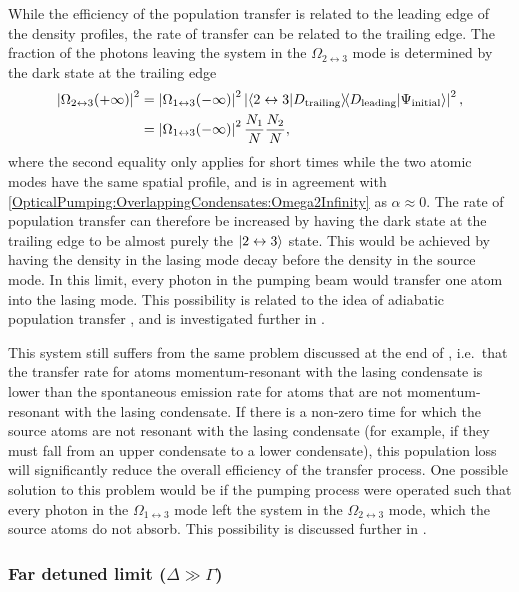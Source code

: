 While the efficiency of the population transfer is related to the leading edge of the density profiles, the rate of transfer can be related to the trailing edge.  The fraction of the photons leaving the system in the $\Omega_{2\leftrightarrow 3}$ mode is determined by the dark state at the trailing edge
\begin{align}
    \left|\Omega_{2\leftrightarrow 3}(+\infty)\right|^2 &= \left|\Omega_{1\leftrightarrow 3}(-\infty)\right|^2 \left|\left<2 \leftrightarrow 3\middle|D_\text{trailing}\right>\!\! \left<D_\text{leading}\middle|\Psi_\text{initial}\right>\right|^2, \\
    &= \left|\Omega_{1\leftrightarrow 3}(-\infty)\right|^2 \frac{N_1}{N} \frac{N_2}{N},
\end{align}
where the second equality only applies for short times while the two atomic modes have the same spatial profile, and is in agreement with \eqref{OpticalPumping:OverlappingCondensates:Omega2Infinity} as $\alpha \approx 0$.  The rate of population transfer can therefore be increased by having the dark state at the trailing edge to be almost purely the ${\left|2 \leftrightarrow 3\right>}$ state.  This would be achieved by having the density in the lasing mode decay before the density in the source mode.  In this limit, every photon in the pumping beam would transfer one atom into the lasing mode.  This possibility is related to the idea of adiabatic population transfer \citep{Kuklinski:1989}, and is investigated further in .


This system still suffers from the same problem discussed at the end of , i.e.\ that the transfer rate for atoms momentum-resonant with the lasing condensate is lower than the spontaneous emission rate for atoms that are not momentum-resonant with the lasing condensate.  If there is a non-zero time for which the source atoms are not resonant with the lasing condensate (for example, if they must fall from an upper condensate to a lower condensate), this population loss will significantly reduce the overall efficiency of the transfer process.  One possible solution to this problem would be if the pumping process were operated such that every photon in the $\Omega_{1\leftrightarrow 3}$ mode left the system in the $\Omega_{2\leftrightarrow 3}$ mode, which the source atoms do not absorb.  This possibility is discussed further in .

\subsubsection{Far detuned limit ($\Delta \gg \Gamma$)}

